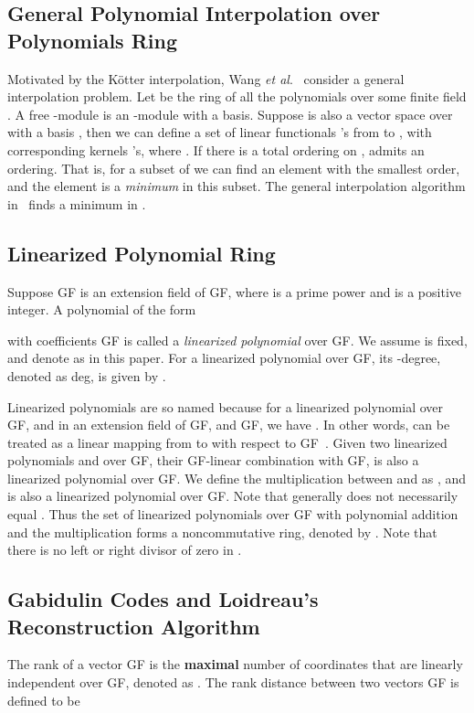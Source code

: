 \documentclass[11pt,onecolumn,draftcls]{IEEEtran}
\begin{document}
\subsection{General Polynomial Interpolation over Polynomials Ring}
Motivated by the K\"{o}tter interpolation, Wang \emph{et al}.~\cite{WangMcEliece05} consider a general interpolation problem. Let  be the ring of all the polynomials over some finite field . A free -module  is an -module with a basis. Suppose  is also a vector space over  with a basis , then we can define a set of  linear functionals 's from  to , with corresponding kernels 's, where . If there is a total ordering on ,  admits an ordering. That is, for a subset of  we can find an element with the smallest order, and the element is a \emph{minimum} in this subset. The general interpolation algorithm in~\cite{WangMcEliece05} finds a minimum in .




\subsection{Linearized Polynomial Ring} \label{sec: L[x]}
Suppose GF is an extension field of GF, where  is a prime power and  is a positive integer. A polynomial of the form

with coefficients  GF is called a \emph{linearized polynomial} over GF. We assume  is fixed, and denote  as  in this paper. For a linearized polynomial  over GF, its -degree, denoted as deg, is given by .

Linearized polynomials are so named because for a linearized polynomial  over GF,  and  in an extension field  of GF, and  GF, we have . In other words,  can be treated as a linear mapping from  to  with respect to GF~\cite{lidl_book83}. Given two linearized polynomials  and   over GF, their GF-linear combination  with  GF, is also a linearized polynomial over GF. We define the multiplication between  and   as , and  is also a linearized polynomial over GF. Note that generally  does not necessarily equal . Thus the set of linearized polynomials over GF with polynomial addition and the multiplication  forms a noncommutative ring, denoted by . Note that there is no left or right divisor of zero in \cite{ore_ams33}.

\subsection{Gabidulin Codes and Loidreau's Reconstruction Algorithm}\label{sec: GB}
The rank of a vector  GF is the \textbf{maximal} number of coordinates that are linearly independent over GF, denoted as . The rank distance between two vectors  GF is defined to be
\end{document}
